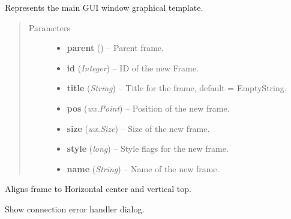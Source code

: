 \documentclass[letterpaper,10pt,english]{sphinxmanual}
\begin{document}

\begin{fulllineitems}
\label{graphicaldesign:graphicaldesign.GUItemplate}
Represents the main GUI window graphical template.
\begin{quote}\begin{description}
\item[{Parameters}] \leavevmode\begin{itemize}
\item {} 
\textbf{parent} () -- Parent frame.

\item {} 
\textbf{id} (\emph{Integer}) -- ID of the new Frame.

\item {} 
\textbf{title} (\emph{String}) -- Title for the frame, default = EmptyString.

\item {} 
\textbf{pos} (\emph{wx.Point}) -- Position of the new frame.

\item {} 
\textbf{size} (\emph{wx.Size}) -- Size of the new frame.

\item {} 
\textbf{style} (\emph{long}) -- Style flags for the new frame.

\item {} 
\textbf{name} (\emph{String}) -- Name of  the new frame.

\end{itemize}

\end{description}\end{quote}

\begin{fulllineitems}
\label{graphicaldesign:graphicaldesign.GUItemplate.AlignCenterTop}
Aligns frame to Horizontal center and vertical top.

\end{fulllineitems}


\begin{fulllineitems}
\label{graphicaldesign:graphicaldesign.GUItemplate.ConnectionErrorHandler}
Show connection error handler dialog.


\end{fulllineitems}
\end{fulllineitems}
\end{document}
